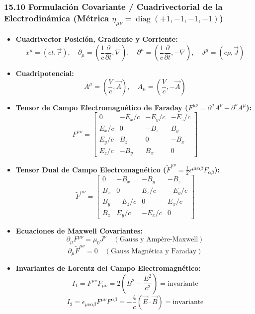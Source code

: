 \documentclass[11pt,a4paper]{article}
\begin{document}
\subsubsection*{15.10 Formulación Covariante / Cuadrivectorial de la Electrodinámica (Métrica $\eta_{\mu\nu} = \operatorname{diag}(+1, -1, -1, -1)$)}

\begin{itemize}
  \item \textbf{Cuadrivector Posición, Gradiente y Corriente:}
  \[
    x^\mu = (ct, \vec{r}), \quad \partial_\mu = \left( \frac{1}{c}\frac{\partial}{\partial t}, \nabla \right), \quad \partial^\mu = \left( \frac{1}{c}\frac{\partial}{\partial t}, -\nabla \right), \quad J^\mu = (c\rho, \vec{J})
  \]
  \item \textbf{Cuadripotencial:}
  \[
    A^\mu = \left( \frac{V}{c}, \vec{A} \right), \quad A_\mu = \left( \frac{V}{c}, -\vec{A} \right)
  \]
  \item \textbf{Tensor de Campo Electromagnético de Faraday ($F^{\mu\nu} = \partial^\mu A^\nu - \partial^\nu A^\mu$):}
  \[
    F^{\mu\nu} = \begin{bmatrix} 0 & -E_x/c & -E_y/c & -E_z/c \\ E_x/c & 0 & -B_z & B_y \\ E_y/c & B_z & 0 & -B_x \\ E_z/c & -B_y & B_x & 0 \end{bmatrix}
  \]
  \item \textbf{Tensor Dual de Campo Electromagnético ($\tilde{F}^{\mu\nu} = \frac{1}{2} \epsilon^{\mu\nu\alpha\beta} F_{\alpha\beta}$):}
  \[
    \tilde{F}^{\mu\nu} = \begin{bmatrix} 0 & -B_x & -B_y & -B_z \\ B_x & 0 & E_z/c & -E_y/c \\ B_y & -E_z/c & 0 & E_x/c \\ B_z & E_y/c & -E_x/c & 0 \end{bmatrix}
  \]
  \item \textbf{Ecuaciones de Maxwell Covariantes:}
  \[
    \partial_\mu F^{\mu\nu} = \mu_0 J^\nu \quad (\text{Gauss y Ampère-Maxwell})
  \]
  \[
    \partial_\mu \tilde{F}^{\mu\nu} = 0 \quad (\text{Gauss Magnética y Faraday})
  \]
  \item \textbf{Invariantes de Lorentz del Campo Electromagnético:}
  \[
    I_1 = F^{\mu\nu} F_{\mu\nu} = 2 \left( B^2 - \frac{E^2}{c^2} \right) = \text{invariante}
  \]
  \[
    I_2 = \epsilon_{\mu\nu\alpha\beta} F^{\mu\nu} F^{\alpha\beta} = -\frac{4}{c} (\vec{E} \cdot \vec{B}) = \text{invariante}
  \]
\end{itemize}
\end{document}
